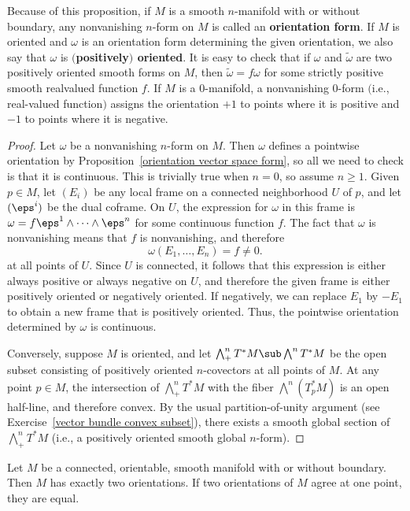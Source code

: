 \begin{remark}
Because of this proposition, if $M$ is a smooth $n$-manifold with or without boundary, any nonvanishing $n$-form on $M$ is called an \textbf{orientation form}. If $M$ is oriented and $\omega$ is an orientation form determining the given orientation, we also say that $\omega$ is \textbf{$($positively$)$ oriented}. It is easy to check that if $\omega$ and $\widetilde{\omega}$ are two positively oriented smooth forms on $M$, then $\widetilde{\omega}=f\omega$ for some strictly positive smooth realvalued function $f$. If $M$ is a $0$-manifold, a nonvanishing $0$-form $($i.e., real-valued function$)$ assigns the orientation $+1$ to points where it is positive and $-1$ to points where it is negative.
\end{remark}
\begin{proof}
Let $\omega$ be a nonvanishing $n$-form on $M$. Then $\omega$ defines a pointwise orientation by Proposition~\ref{orientation vector space form}, so all we need to check is that it is continuous. This is trivially true when $n=0$, so assume $n\geq1$. Given $p\in M$, let $(E_i)$ be any local frame on a connected neighborhood $U$ of $p$, and let $(\eps^i)$ be the dual coframe. On $U$, the expression for $\omega$ in this frame is $\omega=f\eps^1\wedge\cdots\wedge\eps^n$ for some continuous function $f$. The fact that $\omega$ is nonvanishing means that $f$ is nonvanishing, and therefore
\[\omega(E_1,\dots,E_n)=f\neq 0.\]
at all points of $U$. Since $U$ is connected, it follows that this expression is either
always positive or always negative on $U$, and therefore the given frame is either
positively oriented or negatively oriented. If negatively, we can replace $E_1$ by $-E_1$ to obtain a new frame that is positively oriented. Thus, the pointwise orientation determined by $\omega$ is continuous.\par
Conversely, suppose $M$ is oriented, and let $\bigwedge^n_+T^*M\sub\bigwedge^nT^*M$ be the open subset consisting of positively oriented $n$-covectors at all points of $M$. At any point $p\in M$, the intersection of $\bigwedge^n_+T^*M$ with the fiber $\bigwedge^n(T^*_pM)$ is an open half-line, and therefore convex. By the usual partition-of-unity argument (see Exercise~\ref{vector bundle convex subset}), there exists a smooth global section of $\bigwedge^n_+T^*M$ (i.e., a positively oriented smooth global $n$-form).
\end{proof}
\begin{corollary}\label{orientation connected}
Let $M$ be a connected, orientable, smooth manifold with or without boundary. Then $M$ has exactly two orientations. If two orientations of $M$ agree at one point, they are equal.
\end{corollary}
